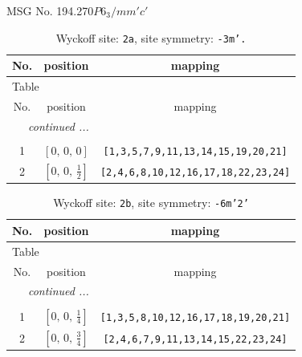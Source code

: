 \documentclass[fleqn,8pt]{jsarticle}
\begin{document}
\setcounter{MaxMatrixCols}{32}

\renewcommand{\tablename}{Table~}
\renewcommand{\figurename}{Figure~}
\begin{center}
\LARGE
MSG No. 194.270\quad$P6_{3}/mm'c'$
\end{center}
\renewcommand{\arraystretch}{1.2}
\begin{longtable}{ccc}
\caption{Wyckoff site: {\tt 2a}, site symmetry: {\tt -3m'.}}
 \\
 \hline \hline
No. & position & mapping \\ \hline \endfirsthead

\multicolumn{2}{l}{\tablename\ \thetable{}} \\
 \hline \hline
No. & position & mapping \\ \hline \endhead

 \hline \hline
\multicolumn{2}{r}{\footnotesize\it continued ...} \\ \endfoot

 \hline \hline
\multicolumn{2}{r}{} \\ \endlastfoot

1 & $\left[ 0,\, 0,\, 0 \right]$ & {\tt [1,3,5,7,9,11,13,14,15,19,20,21]} \\ \hline
2 & $\left[ 0,\, 0,\, \frac{1}{2} \right]$ & {\tt [2,4,6,8,10,12,16,17,18,22,23,24]} \\
\end{longtable}
\renewcommand{\arraystretch}{1.2}
\begin{longtable}{ccc}
\caption{Wyckoff site: {\tt 2b}, site symmetry: {\tt -6m'2'}}
 \\
 \hline \hline
No. & position & mapping \\ \hline \endfirsthead

\multicolumn{2}{l}{\tablename\ \thetable{}} \\
 \hline \hline
No. & position & mapping \\ \hline \endhead

 \hline \hline
\multicolumn{2}{r}{\footnotesize\it continued ...} \\ \endfoot

 \hline \hline
\multicolumn{2}{r}{} \\ \endlastfoot

1 & $\left[ 0,\, 0,\, \frac{1}{4} \right]$ & {\tt [1,3,5,8,10,12,16,17,18,19,20,21]} \\ \hline
2 & $\left[ 0,\, 0,\, \frac{3}{4} \right]$ & {\tt [2,4,6,7,9,11,13,14,15,22,23,24]} \\
\end{longtable}
\end{document}
